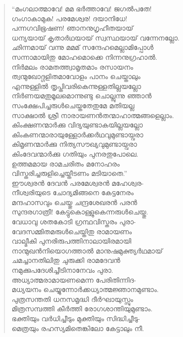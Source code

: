 \begin{verse}
“മംഗലാത്മാവേ! മമ ഭര്‍ത്താവേ! ജഗല്‍പതേ!\\
ഗംഗാകാമുക! പരമേശ്വര! ദയാനിധേ!\\
പന്നഗവിഭൂഷണ! ഞാനനുഗൃഹീതയായ്\\
ധന്യയായ് കൃതാര്‍ഥയായ് സ്വസ്ഥയായ് വന്നേനല്ലോ.\\
ഛിന്നമായ് വന്നു മമമ് സന്ദേഹമെല്ലാമിപ്പോള്‍\\
സന്നാമായിതു മോഹമൊക്കെ നിന്നനുഗ്രഹാല്‍.\\
നിര്‍മലം രാമതത്ത്വാമൃതമാം രസായനം\\
ത്വന്മുഖോദ്ഗളിതമാവോളം പാനം ചെയ്താലും\\
എന്നുള്ളില്‍ തൃപ്തിവരികെന്നുള്ളതില്ലയല്ലോ\\
നിര്‍ണയമതുമൂലമൊന്നുണ്ടു ചൊല്ലുന്നു ഞ്ഞാന്‍\\
സംക്ഷേപിച്ചരുള്‍ചെയ്തതേതുമേ മതിയല്ല\\
സാക്ഷാല്‍ ശ്രീ നാരായണന്‍തന്മാഹാത്മങ്ങളെല്ലാം.\\
കിംക്ഷണന്മാര്‍ക്കു വിദ്യയുണ്ടാകയില്ലയല്ലോ\\
കിംകണന്മാരായുള്ളോര്‍ക്കര്‍ഥവുമുണ്ടായ്വരാ\\
കിമൃണന്മാര്‍ക്കു നിത്യസൗഖ്യവുമുണ്ടായ്വരാ\\
കിംദേവന്മാര്‍ക്കു ഗതിയും പുനരതുപോലെ.\\
ഉത്തമമായ രാമചരിതം മനോഹരം\\
വിസ്തരിച്ചരുളിച്ചെയ്തീടണം മടിയാതെ.”\\
ഈശ്വരന്‍ ദേവന്‍ പരമേശ്വരന്‍ മഹേശ്വര-\\
നീശ്വരിയുടെ ചോദ്യമിങ്ങനെ കേട്ടനേരം\\
മന്ദഹാസവും ചെയ്തു ചന്ദ്രശേഖരന്‍ പരന്‍\\
സുന്ദരഗാത്രീ! കേട്ടുകൊള്ളുകെന്നരുള്‍ചെയ്തു.\\
വേധാവു ശതകോടി ഗ്രന്ഥവിസ്തരം പുരാ-\\
വേദസമ്മിതമരുള്‍ചെയ്തിതു രാമായണം\\
വാല്മീകി പുനരിരുപത്തിനാലായിരമായി\\
നാന്മുഖന്‍നിയൊഗത്താല്‍ മാനുഷമുക്ത്യര്‍ഥമായ്\\
ചമച്ചാനതിലിതു ചുരുക്കി രാമദേവന്‍\\
നമുക്കുപദേശിച്ചീടിനാനേവം പുരാ.\\
അധ്യാത്മരാമായണമെന്ന പേരിതിന്നിദ-\\
മധ്യയനം ചെയ്യുന്നോര്‍ക്കധ്യാത്മജ്ഞാനമുണ്ടാം.\\
പുത്രസന്തതി ധനസമൃദ്ധി ദീര്‍ഘായുസ്സും\\
മിത്രസമ്പത്തി കീര്‍ത്തി രോഗശാന്തിയുമുണ്ടാം.\\
ഭക്തിയും വര്‍ധിച്ചീടും മുക്തിയും സിദ്ധിച്ചീടു-\\
മെത്രയും രഹസ്യമിതെങ്കിലോ കേട്ടാലും നീ.
\end{verse}

